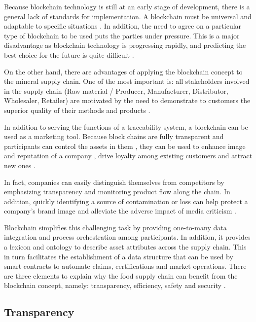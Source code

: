 Because blockchain technology is still at an early stage of development, there is a general lack of standards for implementation. A blockchain must be universal and adaptable to specific situations \cite{valenta2017comparison}. In addition, the need to agree on a particular type of blockchain to be used puts the parties under pressure. This is a major disadvantage as blockchain technology is progressing rapidly, and predicting the best choice for the future is quite difficult \cite{galvez2018future}.

On the other hand, there are advantages of applying the blockchain concept to the mineral supply chain. One of the most important is: all stakeholders involved in the supply chain (Raw material / Producer, Manufacturer, Distributor, Wholesaler, Retailer) are motivated by the need to demonstrate to customers the superior quality of their methods and products \cite{lu2017adaptable}. 

In addition to serving the functions of a traceability system, a blockchain can be used as a marketing tool. Because block chains are fully transparent\cite{iansiti2017truth} and participants can control the assets in them \cite{liao2011food}, they can be used to enhance image and reputation of a company \cite{van2007essentials}, drive loyalty among existing customers \cite{pizzuti2015global} and attract new ones \cite{svensson2009transparency}. 

In fact, companies can easily distinguish themselves from competitors by emphasizing transparency and monitoring product flow along the chain. In addition, quickly identifying a source of contamination or loss can help protect a company's brand image \cite{mejia2010traceability} and alleviate the adverse impact of media criticism \cite{dabbene2011food}.

Blockchain simplifies this challenging task by providing one-to-many data integration and process orchestration among participants. In addition, it provides a lexicon and ontology to describe asset attributes across the supply chain. This in turn facilitates the establishment of a data structure that can be used by smart contracts to automate claims, certifications and market operations. There are three elements to explain why the food supply chain can benefit from the blockchain concept, namely: transparency, efficiency, safety and security \cite{galvez2018future}.

\subsection{Transparency}\label{sec:transparency}

